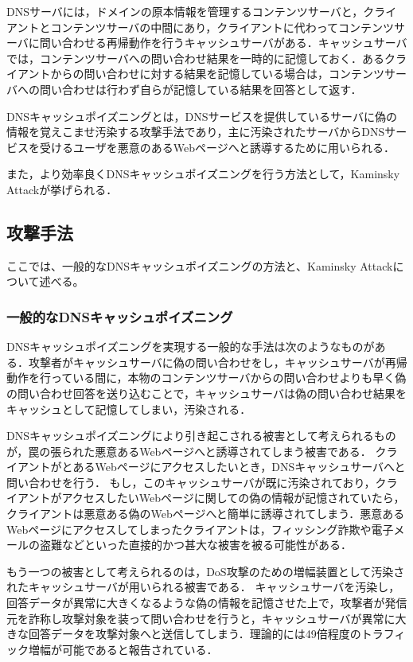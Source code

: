 DNSサーバには，ドメインの原本情報を管理するコンテンツサーバと，クライアントとコンテンツサーバの中間にあり，クライアントに代わってコンテンツサーバに問い合わせる再帰動作を行うキャッシュサーバがある．キャッシュサーバでは，コンテンツサーバへの問い合わせ結果を一時的に記憶しておく．あるクライアントからの問い合わせに対する結果を記憶している場合は，コンテンツサーバへの問い合わせは行わず自らが記憶している結果を回答として返す．

DNSキャッシュポイズニングとは，DNSサービスを提供しているサーバに偽の情報を覚えこませ汚染する攻撃手法であり，主に汚染されたサーバからDNSサービスを受けるユーザを悪意のあるWebページへと誘導するために用いられる．

また，より効率良くDNSキャッシュポイズニングを行う方法として，Kaminsky Attackが挙げられる．

\subsection{攻撃手法}
ここでは、一般的なDNSキャッシュポイズニングの方法と、Kaminsky Attackについて述べる。

\subsubsection{一般的なDNSキャッシュポイズニング}
DNSキャッシュポイズニングを実現する一般的な手法は次のようなものがある．攻撃者がキャッシュサーバに偽の問い合わせをし，キャッシュサーバが再帰動作を行っている間に，本物のコンテンツサーバからの問い合わせよりも早く偽の問い合わせ回答を送り込むことで，キャッシュサーバは偽の問い合わせ結果をキャッシュとして記憶してしまい，汚染される．

DNSキャッシュポイズニングにより引き起こされる被害として考えられるものが，罠の張られた悪意あるWebページへと誘導されてしまう被害である．
クライアントがとあるWebページにアクセスしたいとき，DNSキャッシュサーバへと問い合わせを行う．
もし，このキャッシュサーバが既に汚染されており，クライアントがアクセスしたいWebページに関しての偽の情報が記憶されていたら，クライアントは悪意ある偽のWebページへと簡単に誘導されてしまう．悪意あるWebページにアクセスしてしまったクライアントは，フィッシング詐欺や電子メールの盗難などといった直接的かつ甚大な被害を被る可能性がある．

もう一つの被害として考えられるのは，DoS攻撃のための増幅装置として汚染されたキャッシュサーバが用いられる被害である．
キャッシュサーバを汚染し，回答データが異常に大きくなるような偽の情報を記憶させた上で，攻撃者が発信元を詐称し攻撃対象を装って問い合わせを行うと，キャッシュサーバが異常に大きな回答データを攻撃対象へと送信してしまう．理論的には49倍程度のトラフィック増幅が可能であると報告されている．\cite{ipa}

